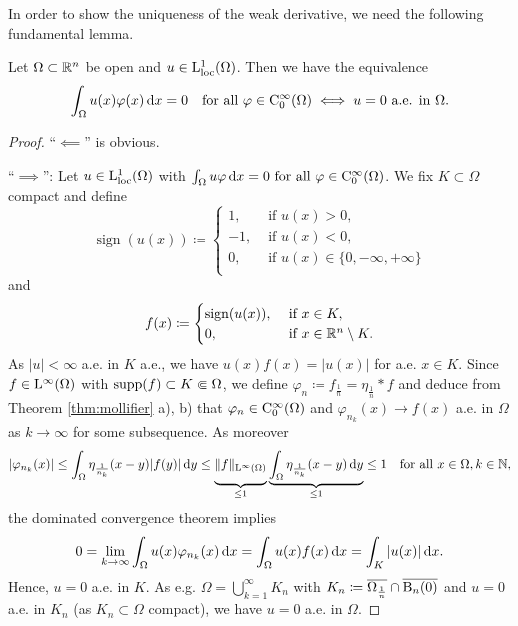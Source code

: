 In order to show the uniqueness of the weak derivative, we need the following fundamental lemma.

\begin{lem}
  \label{lem:fundamental}
  Let $\Omega \subset \mathbb{R}^n$ be open and $u \in \mathrm{L}_{\operatorname{loc}}^1(\Omega)$.
  Then we have the equivalence
  $$
  \int_\Omega u(x) \varphi(x) \, {\operatorname{d}\!{x}} = 0 \quad\text{for all } \varphi \in \mathrm{C}_0^\infty(\Omega) \iff u = 0 \text{ a.e. in } \Omega.
  $$
\end{lem}

\begin{proof}
  ``$\impliedby$'' is obvious.

  ``$\implies$'': Let $u \in \mathrm{L}^1_{\operatorname{loc}}(\Omega)$ with $\int_\Omega u\varphi \, {\operatorname{d}\!{x}} = 0 \text{ for all } \varphi \in \mathrm{C}_0^\infty(\Omega)$.
We fix $K \subset \Omega$ compact and define
$$
\operatorname{sign}(u(x)) \coloneqq 
\begin{cases} 
  1, &\text{ if } u(x) > 0, \\
  -1, &\text{ if } u(x) <  0, \\
  0, &\text{ if } u(x) \in \{ 0, -\infty, +\infty\} \\
\end{cases}
$$
and
$$
f(x) \coloneqq \begin{cases} \operatorname{sign}(u(x)), &\text{ if } x \in K, \\ 0,  &\text{ if } x \in \mathbb{R}^n \setminus K. \end{cases}
$$
As $|u| < \infty$ a.e. in $K$ a.e., we have $u(x)f(x) = |u(x)|$ for a.e. $x \in K$.
Since $f \in \mathrm{L}^\infty(\Omega)$ with $\operatorname{supp}(f) \subset K \Subset \Omega$, we define $\varphi_n \coloneqq f_{\frac{1}{n}} = \eta_{\frac{1}{n}} \ast f$ and deduce from Theorem \ref{thm:mollifier} a), b) that $\varphi_n \in \mathrm{C}_0^\infty(\Omega)$ and $\varphi_{n_k}(x) \to f(x)$ a.e. in $\Omega$ as $k \to \infty$ for some subsequence.
As moreover
$$
|\varphi_{n_k}(x)| 
\leq \int_\Omega \eta_{\frac{1}{n_k}}(x - y) |f(y)| \, {\operatorname{d}\!{y}}
\leq \underbrace{\vphantom{\int_\Omega}\|f\|_{\mathrm{L}^\infty(\Omega)}}_{\leq 1} \underbrace{ \int_\Omega \eta_{\frac{1}{n_k}} (x - y) \, {\operatorname{d}\!{y}}}_{\leq 1}
\leq 1 \quad\text{for all } x \in \Omega, k \in \mathbb{N},
$$
the dominated convergence theorem implies
$$
0 = \lim_{k \to \infty} \int_\Omega u(x) \varphi_{n_k}(x) \, {\operatorname{d}\!{x}} 
= \int_\Omega u(x) f(x) \, {\operatorname{d}\!{x}} = \int_K |u(x)| \, {\operatorname{d}\!{x}}.
$$
Hence, $u = 0$ a.e. in $K$.
As e.g. $\Omega = \bigcup_{k = 1}^\infty K_n$ with $K_n \coloneqq \overline{\Omega_{\frac{1}{n}}} \cap \overline{\mathrm{B}_n(0)}$ and $u = 0$ a.e. in $K_n$ (as $K_n \subset \Omega$ compact), we have $u = 0$ a.e. in $\Omega$.
\end{proof}


